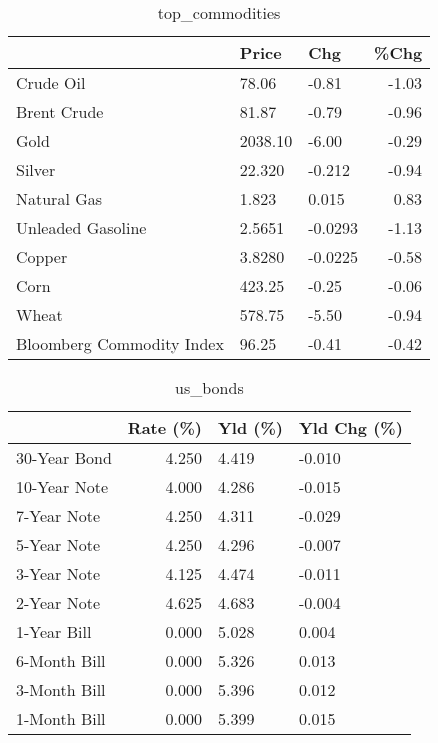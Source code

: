 \documentclass{article}%
\begin{document}
\begin{table}[htbp]%
\caption{top\_commodities}%
\centering%
\begin{adjustbox}{width=1\textwidth}%
\begin{tabular}{lllr}
\toprule
                          &   Price &     Chg &  \%Chg \\
\midrule
               Crude Oil  &   78.06 &   -0.81 & -1.03 \\
             Brent Crude  &   81.87 &   -0.79 & -0.96 \\
                    Gold  & 2038.10 &   -6.00 & -0.29 \\
                  Silver  &  22.320 &  -0.212 & -0.94 \\
             Natural Gas  &   1.823 &   0.015 &  0.83 \\
       Unleaded Gasoline  &  2.5651 & -0.0293 & -1.13 \\
                  Copper  &  3.8280 & -0.0225 & -0.58 \\
                    Corn  &  423.25 &   -0.25 & -0.06 \\
                   Wheat  &  578.75 &   -5.50 & -0.94 \\
Bloomberg Commodity Index &   96.25 &   -0.41 & -0.42 \\
\bottomrule
\end{tabular}
%
\end{adjustbox}%
\end{table}

%


\begin{table}[htbp]%
\caption{us\_bonds}%
\centering%
\begin{adjustbox}{width=1\textwidth}%
\begin{tabular}{lrll}
\toprule
             &  Rate (\%) & Yld (\%) & Yld Chg (\%) \\
\midrule
30-Year Bond &     4.250 &   4.419 &      -0.010 \\
10-Year Note &     4.000 &   4.286 &      -0.015 \\
 7-Year Note &     4.250 &   4.311 &      -0.029 \\
 5-Year Note &     4.250 &   4.296 &      -0.007 \\
 3-Year Note &     4.125 &   4.474 &      -0.011 \\
 2-Year Note &     4.625 &   4.683 &      -0.004 \\
 1-Year Bill &     0.000 &   5.028 &       0.004 \\
6-Month Bill &     0.000 &   5.326 &       0.013 \\
3-Month Bill &     0.000 &   5.396 &       0.012 \\
1-Month Bill &     0.000 &   5.399 &       0.015 \\
\bottomrule
\end{tabular}
%
\end{adjustbox}%
\end{table}
\end{document}
